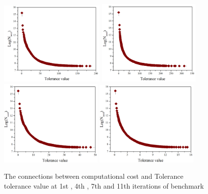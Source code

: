 \documentclass[review]{elsarticle}
\begin{document}
\begin{figure}
    \centering
    \includegraphics[width = 0.46\textwidth]{fig/connection1.png}
    \includegraphics[width = 0.45\textwidth]{fig/connection2.png}
    \includegraphics[width = 0.45\textwidth]{fig/connection3.png}
    \includegraphics[width = 0.45\textwidth]{fig/connection4.png}
    \caption{The connections between computational cost and Tolerance tolerance value at 1st , 4th , 7th and 11th iterations of benchmark}
    \label{fig:connection}
\end{figure}
\end{document}
